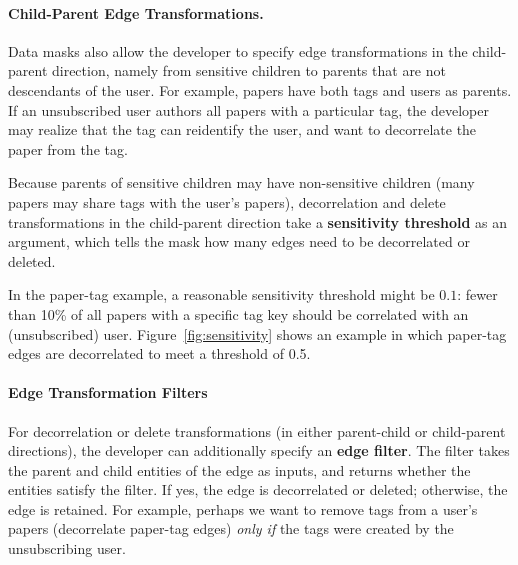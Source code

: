 
\paragraph{Child-Parent Edge Transformations.}
Data masks also allow the developer to specify edge transformations in the child-parent direction,
namely from sensitive children to parents that are not descendants of the user.
%
For example, papers have both tags and users as parents. If an unsubscribed user authors all papers
with a particular tag, the developer may realize that the tag can reidentify the user, and want to
decorrelate the paper from the tag.

Because parents of sensitive children may have non-sensitive children (\eg many papers may share
tags with the user's papers), decorrelation and delete transformations in the child-parent direction
take a \textbf{sensitivity threshold} as an argument, which tells the mask how many edges need to be
decorrelated or deleted.

In the paper-tag example, a reasonable sensitivity threshold
might be $0.1$: fewer than 10\% of all papers with a specific tag key should be correlated with an
(unsubscribed) user.  Figure~\ref{fig:sensitivity} shows an example in which paper-tag edges are
decorrelated to meet a threshold of 0.5.

\paragraph{Edge Transformation Filters}
For decorrelation or delete transformations (in either parent-child or child-parent directions), the
developer can additionally specify an \textbf{edge filter}. The filter takes the parent and child
entities of the edge as inputs, and returns whether the entities satisfy the filter. If yes, the
edge is decorrelated or deleted; otherwise, the edge is retained.
%
For example, perhaps we want to remove tags from a user's papers (decorrelate paper-tag edges)
\emph{only if} the tags were created by the unsubscribing user.
\fi


